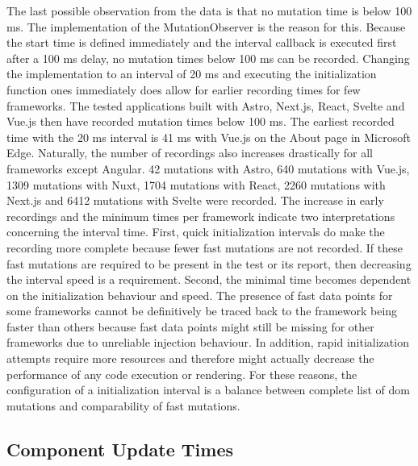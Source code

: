 \documentclass[a4paper, 10pt]{article}
\begin{document}
The last possible observation from the data is that no mutation time is below 100 ms.
The implementation of the MutationObserver is the reason for this.
Because the start time is defined immediately and the interval callback is executed first after a 100 ms delay, no mutation times below 100 ms can be recorded.
Changing the implementation to an interval of 20 ms and executing the initialization function ones immediately does allow for earlier recording times for few frameworks.
The tested applications built with Astro, Next.js, React, Svelte and Vue.js then have recorded mutation times below 100 ms.
The earliest recorded time with the 20 ms interval is 41 ms with Vue.js on the About page in Microsoft Edge.
Naturally, the number of recordings also increases drastically for all frameworks except Angular.
42 mutations with Astro, 640 mutations with Vue.js, 1309 mutations with Nuxt, 1704 mutations with React, 2260 mutations with Next.js and 6412 mutations with Svelte were recorded.
The increase in early recordings and the minimum times per framework indicate two interpretations concerning the interval time.
First, quick initialization intervals do make the recording more complete because fewer fast mutations are not recorded.
If these fast mutations are required to be present in the test or its report, then decreasing the interval speed is a requirement.
Second, the minimal time becomes dependent on the initialization behaviour and speed.
The presence of fast data points for some frameworks cannot be definitively be traced back to the framework being faster than others because fast data points might still be missing for other frameworks due to unreliable injection behaviour.
In addition, rapid initialization attempts require more resources and therefore might actually decrease the performance of any code execution or rendering.
For these reasons, the configuration of a initialization interval is a balance between complete list of \acrshort{dom} mutations and comparability of fast mutations.

\subsection{Component Update Times}\label{subsec:componentupdatetimes}
\end{document}
